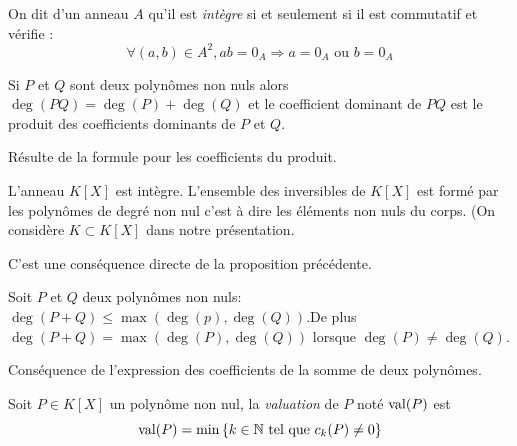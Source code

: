 \begin{defi}
 On dit d'un anneau $A$ qu'il est \emph{intègre} si et seulement si il est commutatif et vérifie :
\begin{displaymath}
 \forall(a,b)\in A^2, ab=0_A \Rightarrow a=0_A \text{ ou } b=0_A
\end{displaymath}
\end{defi}

\begin{prop}
 Si $P$ et $Q$ sont deux polynômes non nuls alors $\deg(PQ) = \deg(P)+\deg(Q)$ et le coefficient dominant de $PQ$ est le produit des coefficients dominants de $P$ et $Q$.
\end{prop}
\begin{demo}
 Résulte de la formule pour les coefficients du produit.
\end{demo}
 
\begin{prop}
 L'anneau $K[X]$ est intègre. L'ensemble des inversibles de $K[X]$ est formé par les polynômes de degré non nul c'est à dire les éléments non nuls du corps. (On considère $K\subset K[X]$ dans notre présentation.
\end{prop}
\begin{demo}
 C'est une conséquence directe de la proposition précédente.
\end{demo}

\begin{prop}
  Soit $P$ et $Q$ deux polynômes non nuls: $\deg(P+Q) \leq \max(\deg(p),\deg(Q))$.\newline De plus $\deg(P+Q)=\max(\deg(P),\deg(Q))$ lorsque $\deg(P)\neq \deg(Q)$.
\end{prop}
\begin{demo}
 Conséquence de l'expression des coefficients de la somme de deux polynômes.
\end{demo}

\begin{defi}[valuation]
 Soit $P\in K[X]$ un polynôme non nul, la \emph{valuation} de $P$ noté $\mathop{\mathrm{val}}(P)$ est
\begin{displaymath}
 \mathop{\mathrm{val}}(P)=\min \left\lbrace k\in\mathbb{N} \text{ tel que } c_k(P)\neq 0 \right\rbrace 
\end{displaymath}
\end{defi}

